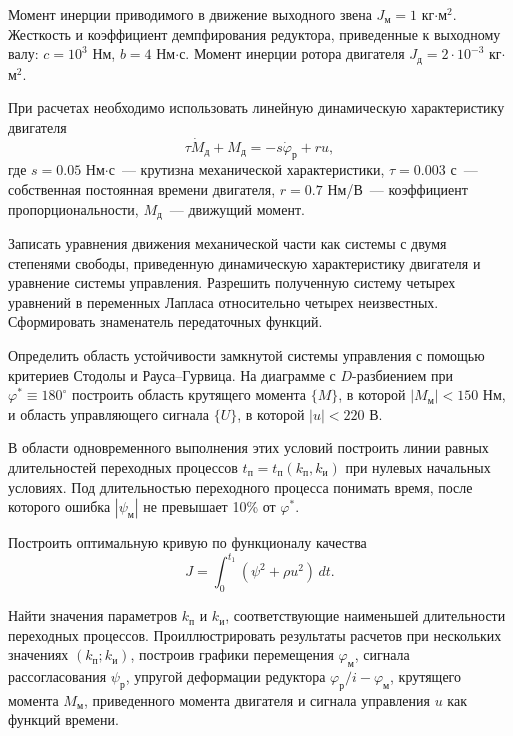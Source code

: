 Момент инерции приводимого в движение выходного звена $J_{\text{м}} = 1$ кг$\cdot$м$^2$. Жесткость и коэффициент демпфирования редуктора, приведенные к выходному валу: $c = 10^3$ Нм, $b = 4$ Нм$\cdot$с. Момент инерции ротора двигателя $J_{\text{д}} = 2 \cdot 10^{-3}$ кг$\cdot$м$^2$.

При расчетах необходимо использовать линейную динамическую характеристику двигателя
\[
\tau \dot M_{\text{д}} + M_{\text{д}} = -s \dot \varphi_{\text{р}} + r u,
\]
где $s = 0.05$ Нм$\cdot$с~--- крутизна механической характеристики, $\tau = 0.003$ с~--- собственная постоянная времени двигателя, $r = 0.7$ Нм/В~--- коэффициент пропорциональности, $M_{\text{д}}$~--- движущий момент.

Записать уравнения движения механической части как системы с двумя степенями свободы, приведенную динамическую характеристику двигателя и уравнение системы управления. Разрешить полученную систему четырех уравнений в переменных Лапласа относительно четырех неизвестных. Сформировать знаменатель передаточных функций.

Определить область устойчивости замкнутой системы управления с помощью критериев Стодолы и Рауса--Гурвица. На диаграмме с $D$-разбиением при $\varphi^* \equiv 180^\circ$ построить область крутящего момента $\{M\}$, в которой $|M_{\text{м}}| < 150$ Нм, и область управляющего сигнала $\{U\}$, в которой $|u| < 220$ В.

В области одновременного выполнения этих условий построить линии равных длительностей переходных процессов $t_{\text{п}} = t_{\text{п}}(k_{\text{п}}, k_{\text{и}})$ при нулевых начальных условиях. Под длительностью переходного процесса понимать время, после которого ошибка $|\psi_{\text{м}}|$ не превышает 10\% от $\varphi^*$.

Построить оптимальную кривую по функционалу качества
\[
J = \int_0^{t_1} \left(\psi^2 + \rho u^2\right)\,dt.
\]

Найти значения параметров $k_{\text{п}}$ и $k_{\text{и}}$, соответствующие наименьшей длительности переходных процессов. Проиллюстрировать результаты расчетов при нескольких значениях $(k_{\text{п}}; k_{\text{и}})$, построив графики перемещения $\varphi_{\text{м}}$, сигнала рассогласования $\psi_{\text{р}}$, упругой деформации редуктора $\varphi_{\text{р}}/i - \varphi_{\text{м}}$, крутящего момента $M_{\text{м}}$, приведенного момента двигателя и сигнала управления $u$ как функций времени.

